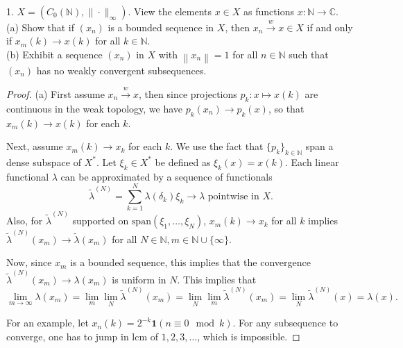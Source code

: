 
\begin{problem}
	1. $X=\left(C_0(\mathbb{N}),\|\cdot\|_{\infty}\right)$. View the elements $x \in X$ as functions $x: \mathbb{N} \rightarrow \mathbb{C}$.\\
(a) Show that if $\left(x_n\right)$ is a bounded sequence in $X$, then $x_n \xrightarrow{w} x \in X$ if and only if $x_m(k) \rightarrow x(k)$ for all $k \in \mathbb{N}$.\\
(b) Exhibit a sequence $\left(x_n\right)$ in $X$ with $\left\|x_n\right\|=1$ for all $n \in \mathbb{N}$ such that $\left(x_n\right)$ has no weakly convergent subsequences.
\end{problem}
\begin{proof}
	(a) First assume $x_n \xrightarrow{w} x $, then since projections  $p_k: x \mapsto x(k)$ are continuous in the weak topology, we have $p_k(x_n) \to p_k(x)$, so that $x_m(k) \to x(k)$ for each $k$.

	Next, assume $x_m(k) \to x_k$ for each $k$. We use the fact that $\{p_k\} _{k \in \mathbb{N}}$ span a dense subspace of $X^*$. Let $\xi_k \in X^*$ be defined as $\xi_k(x) = x(k)$. Each linear functional $\lambda$ can be approximated by a sequence of functionals
	\[
		\tilde \lambda ^{(N)}= \sum_{k = 1}^N \lambda(\delta_k) \xi_k \to \lambda \text{ pointwise in }X
	.\] 
	Also, for  $\tilde \lambda^{(N)}$ supported on $\text{span}(\xi_1, \ldots, \xi_N)$, $x_m(k) \to x_k$ for all $k$ implies $\tilde \lambda^{(N)} (x_m) \to \tilde \lambda(x_m)$ for all $N \in \mathbb{N}, m \in \mathbb{N} \cup \{\infty \} $.

	Now, since $x_m$ is a bounded sequence, this implies that the convergence $\tilde \lambda^{(N)} (x_m) \to \lambda(x_m)$ is uniform in $N$. This implies that
	\[
		\lim_{m \to \infty} \lambda(x_m)
		= \lim_m \lim_N \tilde \lambda^{(N)}(x_m)
		= \lim_N \lim_m \tilde \lambda^{(N)}(x_m)
		= \lim_N \tilde \lambda^{(N)}(x)
		= \lambda(x)
	.\] 

	For an example, let $x_n(k) = 2^{-k} \mathbf{1}\left( n \equiv 0 \mod k \right) $. For any subsequence to converge, one has to jump in lcm of $1, 2, 3, \ldots$, which is impossible.
\end{proof}


